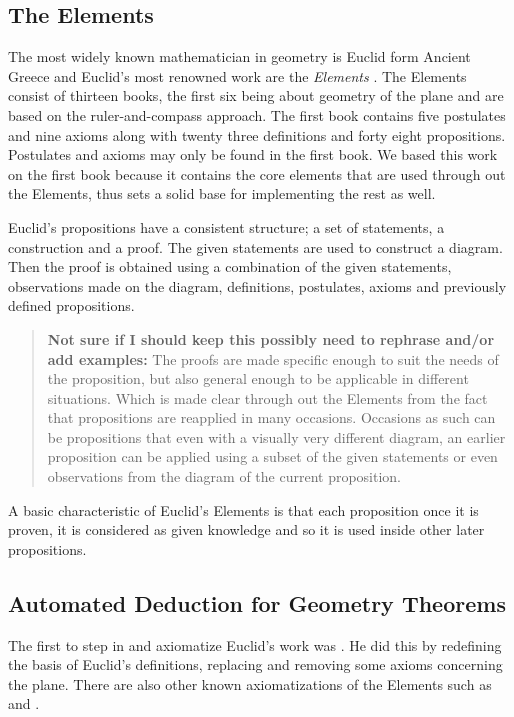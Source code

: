 \documentclass[]{interact}
\theoremstyle{plain}
\theoremstyle{definition}
\theoremstyle{remark}
\newcommand{\comment}[2]
{
\begin{quote}
\textbf{#1:}
     #2
\end{quote}
}
\begin{document}
\subsection{The Elements}
The most widely known mathematician in geometry is Euclid form Ancient
Greece and Euclid's most renowned work are the \textit{Elements}
\citep{heath:1956}. The Elements consist of thirteen books, the first
six being about geometry of the plane and are based on the ruler-and-compass
approach. The first book contains five postulates and nine axioms along with
twenty three definitions and forty eight propositions. Postulates and axioms
may only be found in the first book. We based this work on the first book
because it contains the core elements that are used through out the Elements,
thus sets a solid base for implementing the rest as well.

Euclid’s propositions have a consistent structure; a set of statements, a
construction and a proof. The given statements are used to construct a diagram.
Then the proof is obtained using a combination of the given statements,
observations made on the diagram, definitions, postulates, axioms and
previously defined propositions.
\comment{Not sure if I should keep this possibly need to rephrase and/or add 
examples}{ The proofs are made specific enough to suit the needs of the
proposition, but also general enough to be applicable in different
situations. Which is made clear through out the Elements from the fact that
propositions are reapplied in many occasions. Occasions as such can be
propositions that even with a visually very different diagram, an earlier
proposition can be applied using a subset of the given statements or even
observations from the diagram of the current proposition.}
A basic characteristic of Euclid's
Elements is that each proposition once it is proven, it is considered
as given knowledge and so it is used inside other later propositions.


\subsection{Automated Deduction for Geometry Theorems}
\label{sec:atp-geometry}

The first to step in and axiomatize Euclid's work was \citet{hilbert:1899}.
He did this by redefining the basis of Euclid's definitions,
replacing and removing some axioms concerning the plane. There are
also other known axiomatizations of the Elements such as
\citet{tarski:1959} and \citet{birkhoff:1932}.
\end{document}
